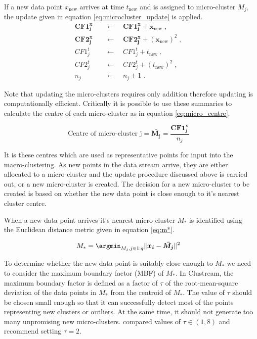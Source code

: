 If a new data point $x_{\text{new}}$ arrives at time $t_{\text{new}}$ and is assigned to micro-cluster $M_j$, the  update  given in equation \eqref{eq:microcluster_update} is applied. 
\begin{align}
\boldsymbol{CF1^x_j} \quad &\leftarrow \quad \boldsymbol{CF1^x_j} + \boldsymbol{x}_{\text{new}} \; , \nonumber  \\ 
\boldsymbol{CF2^x_j} \quad &\leftarrow \quad \boldsymbol{CF2^x_j} + (\boldsymbol{x}_{\text{new}})^2 \; , \nonumber\\
CF1^t_j \quad &\leftarrow \quad  CF1^t_j + t_{\text{new}} \; , \nonumber   \\
CF2^t_j \quad &\leftarrow \quad CF2^t_j + (t_{\text{new}})^2 \; , \nonumber\\
n_j  \quad &\leftarrow \quad n_j + 1 \; .
\label{eq:microcluster_update}
\end{align}

Note that updating the micro-clusters requires only addition therefore updating is computationally efficient. Critically it is possible to use these summaries to calculate the centre of each micro-cluster as in equation \eqref{eq:micro_centre}. 

\begin{equation}
  \label{eq:micro_centre}
  \text{Centre of micro-cluster j}  = \boldsymbol{\bar{M_j}} = \frac{\boldsymbol{CF1^x_j}}{n_j}
\end{equation}

It is these centres which are used as representative points for input into the macro-clustering.  As new points in the data stream arrive, they are either allocated to a micro-cluster and the update procedure discussed above is carried out, or a new micro-cluster is created. The decision for a new micro-cluster to be created is based on whether the new data point is close enough to it's nearest cluster centre. 

When a new data point arrives it's nearest micro-cluster $M_{*}$ is identified using the Euclidean distance metric given in equation \eqref{eq:m*}.

\begin{equation}
  \label{eq:m*}
 M_{*} = \argmin_{M_j , j \in 1:q} \lVert {\boldsymbol{x_i} -\boldsymbol{\bar{M_j}} } \rVert ^2
\end{equation}

To determine whether the new data point is suitably close enough to  $M_{*}$ we need to consider the maximum boundary factor (MBF) of $M_{*}$. In Clustream, the maximum boundary factor is defined as a factor of $\tau$ of the root-mean-square deviation of the data points in $M_{*}$ from the centroid of $M_{*}$.  The value of $\tau$  should be chosen small enough so that it can successfully detect most of the points representing new clusters or outliers. At the same time, it should not generate too many unpromising new micro-clusters. \cite{Aggarwal2003} compared values of $\tau \in (1,8)$ and recommend setting $\tau = 2$. 

